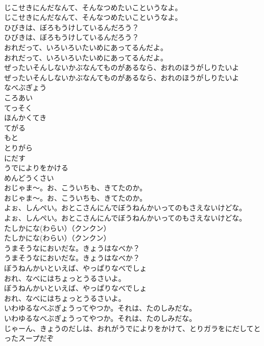 \documentclass[8pt]{extreport}
\begin{document}
\begin{CJK}{UTF8}{min}
\\	じこせきにんだなんて、そんなつめたいこというなよ。
\\	じこせきにんだなんて、そんなつめたいこというなよ。
\\	ひびきは、ぼろもうけしているんだろう？
\\	ひびきは、ぼろもうけしているんだろう？
\\	おれだって、いろいろいたいめにあってるんだよ。
\\	おれだって、いろいろいたいめにあってるんだよ。
\\	ぜったいそんしないかぶなんてものがあるなら、おれのほうがしりたいよ
\\	ぜったいそんしないかぶなんてものがあるなら、おれのほうがしりたいよ
\\	なべぶぎょう
\\	ころあい
\\	てっそく
\\	ほんかくてき
\\	てがる
\\	もと
\\	とりがら
\\	にだす
\\	うでによりをかける
\\	めんどうくさい
\\	おじゃま～。お、こういちも、きてたのか。
\\	おじゃま～。お、こういちも、きてたのか。
\\	よぉ、しんぺい。おとこさんにんでぼうねんかいってのもさえないけどな。
\\	よぉ、しんぺい。おとこさんにんでぼうねんかいってのもさえないけどな。
\\	たしかにな(わらい）（クンクン）
\\	たしかにな(わらい）（クンクン）
\\	うまそうなにおいだな。きょうはなべか？
\\	うまそうなにおいだな。きょうはなべか？
\\	ぼうねんかいといえば、やっぱりなべでしょ
\\	おれ、なべにはちょっとうるさいよ。
\\	ぼうねんかいといえば、やっぱりなべでしょ
\\	おれ、なべにはちょっとうるさいよ。
\\	いわゆるなべぶぎょうってやつか。それは、たのしみだな。
\\	いわゆるなべぶぎょうってやつか。それは、たのしみだな。
\\	じゃーん、きょうのだしは、おれがうでによりをかけて、とりガラをにだしてとったスープだぞ

\end{CJK}
\end{document}

